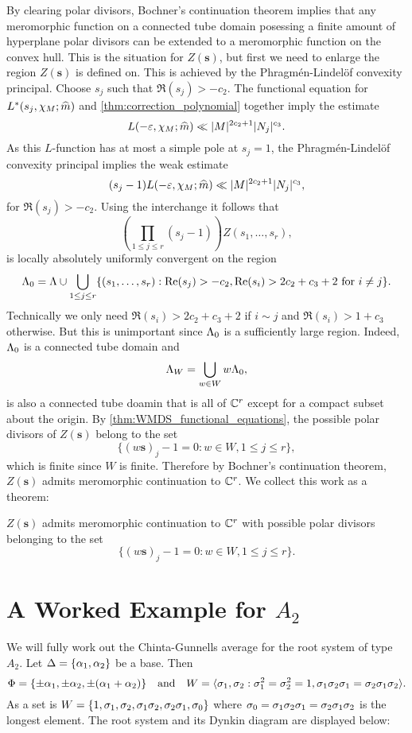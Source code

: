     By clearing polar divisors, Bochner's continuation theorem implies that any meromorphic function on a connected tube domain posessing a finite amount of hyperplane polar divisors can be extended to a meromorphic function on the convex hull. This is the situation for $Z(\mathbf{s})$, but first we need to enlarge the region $Z(\mathbf{s})$ is defined on. This is achieved by the Phragm\'en-Lindel\"of convexity principal. Choose $s_{j}$ such that $\Re(s_{j}) > -c_{2}$. The functional equation for $L^{\ast}(s_{j},\chi_{M};\widehat{m})$ and \cref{thm:correction_polynomial} together imply the estimate
    \[
        L(-\varepsilon,\chi_{M};\widehat{m}) \ll |M|^{2c_{2}+1}|N_{j}|^{c_{3}}.
    \]
    As this $L$-function has at most a simple pole at $s_{j} = 1$, the Phragm\'en-Lindel\"of convexity principal implies the weak estimate
    \[
        (s_{j}-1)L(-\varepsilon,\chi_{M};\widehat{m}) \ll |M|^{2c_{2}+1}|N_{j}|^{c_{3}},
    \]
    for $\Re(s_{j}) > -c_{2}$. Using the interchange it follows that
    \[
        \left(\prod_{1 \le j \le r}(s_{j}-1)\right)Z(s_{1},\ldots,s_{r}),
    \]
    is locally absolutely uniformly convergent on the region
    \[
        \Lambda_{0} = \Lambda \cup \bigcup_{1 \le j \le r} \{(s_{1},\ldots,s_{r}):\mathrm{Re}(s_{j}) > -c_{2}, \mathrm{Re}(s_{i}) > 2c_{2}+c_{3}+2 \text{ for } i \neq j\}.
    \]
    Technically we only need $\Re(s_{i}) > 2c_{2}+c_{3}+2$ if $i \sim j$ and $\Re(s_{i}) > 1+c_{3}$ otherwise. But this is unimportant since $\Lambda_{0}$ is a sufficiently large region. Indeed, $\Lambda_{0}$ is a connected tube domain and
    \[
        \Lambda_{W} = \bigcup_{w \in W}w\Lambda_{0},
    \]
    is also a connected tube doamin that is all of $\mathbb{C}^{r}$ except for a compact subset about the origin. By \cref{thm:WMDS_functional_equations}, the possible polar divisors of $Z(\mathbf{s})$ belong to the set
    \[
        \{(w\mathbf{s})_{j}-1 = 0:w \in W, 1 \le j \le r\},
    \]
    which is finite since $W$ is finite. Therefore by Bochner's continuation theorem, $Z(\mathbf{s})$ admits meromorphic continuation to $\mathbb{C}^{r}$. We collect this work as a theorem:

    \begin{theorem}
        $Z(\mathbf{s})$ admits meromorphic continuation to $\mathbb{C}^{r}$ with possible polar divisors belonging to the set
        \[
            \{(w\mathbf{s})_{j}-1 = 0:w \in W, 1 \le j \le r\}.
        \]
    \end{theorem}
\section{A Worked Example for \texorpdfstring{$A_{2}$}{A{2}}}
    We will fully work out the Chinta-Gunnells average for the root system of type $A_{2}$. Let $\Delta = \{\alpha_{1},\alpha_{2}\}$ be a base. Then
    \[
        \Phi = \{\pm\alpha_{1},\pm\alpha_{2},\pm(\alpha_{1}+\alpha_{2})\} \quad \text{and} \quad W = \langle\sigma_{1},\sigma_{2}:\sigma_{1}^{2} = \sigma_{2}^{2} = 1, \sigma_{1}\sigma_{2}\sigma_{1} = \sigma_{2}\sigma_{1}\sigma_{2}\rangle.
    \]
    As a set is $W = \{1,\sigma_{1},\sigma_{2},\sigma_{1}\sigma_{2},\sigma_{2}\sigma_{1},\sigma_{0}\}$ where $\sigma_{0} = \sigma_{1}\sigma_{2}\sigma_{1} = \sigma_{2}\sigma_{1}\sigma_{2}$ is the longest element. The root system and its Dynkin diagram are displayed below:

